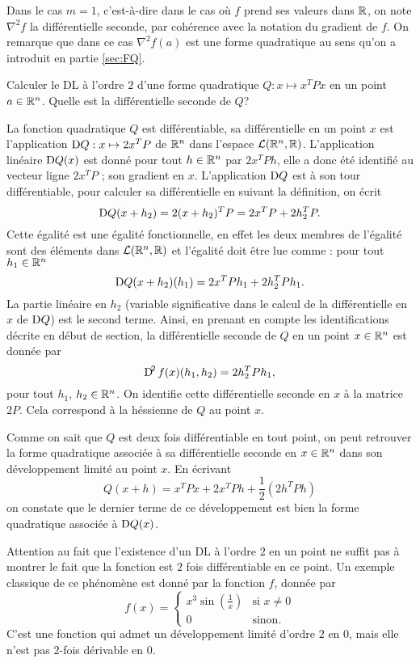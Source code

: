 \documentclass[11pt, a4paper]{article}
\begin{document}
Dans le cas $m = 1$, c'est-à-dire dans le cas où $f$ prend ses valeurs
dans $\mathbb{R}$, on note $\nabla^2f$ la différentielle seconde, par cohérence
avec la notation du gradient de $f$. On remarque que dans ce cas
$\nabla^2f(a)$ est une forme quadratique au sens qu'on a introduit en
partie \ref{sec:FQ}. 
\begin{question}
  Calculer le DL à l'ordre $2$ d'une forme quadratique
  $Q : x \mapsto x^TPx$ en un point $a \in \mathbb{R}^n$. Quelle est la
  différentielle seconde de $Q$?
\end{question}
\begin{solution}
  La fonction quadratique $Q$ est différentiable, sa différentielle en
  un point $x$ est l'application $\operatorname{D\!}{Q} : x \mapsto 2x^TP$ de $\mathbb{R}^n$
  dans l'espace $\mathcal{L}(\mathbb{R}^n, \mathbb{R})$. L'application linéaire $\operatorname{D\!}{Q}(x)$
  est donné pour tout $h \in \mathbb{R}^n$ par $2x^TPh$, elle a donc été
  identifié au vecteur ligne $2x^TP$ ; son gradient en
  $x$. L'application $\operatorname{D\!}{Q}$ est à son tour différentiable, pour
  calculer sa différentielle en suivant la définition, on écrit
  \[
    \operatorname{D\!}{Q}(x + h_2) = 2(x+h_2)^TP = 2x^TP + 2h_2^TP. 
  \]
  Cette égalité est une égalité fonctionnelle, en effet les deux
  membres de l'égalité sont des éléments dans $\mathcal{L}(\mathbb{R}^n, \mathbb{R})$ et
  l'égalité doit être lue comme : pour tout $h_1 \in \mathbb{R}^n$
  \[
    \operatorname{D\!}{Q}(x + h_2)(h_1) = 2x^TPh_1 + 2h_2^TPh_1.
  \]
  La partie linéaire en $h_2$ (variable significative dans le calcul
  de la différentielle en $x$ de $\operatorname{D\!}{Q}$) est le second terme. Ainsi,
  en prenant en compte les identifications décrite en début de
  section, la différentielle seconde de $Q$ en un point $x\in \mathbb{R}^n$ est donnée
  par
  \[
    \operatorname{D\!}^2{f}(x)(h_1, h_2) = 2h_2^TPh_1,
  \]
  pour tout $h_1$, $h_2 \in \mathbb{R}^n$. On identifie cette différentielle
  seconde en $x$ à la matrice $2P$. Cela correspond à la héssienne de
  $Q$ au point $x$.

  Comme on sait que $Q$ est deux fois différentiable en tout point, on
  peut retrouver la forme quadratique associée à sa différentielle
  seconde en $x \in \mathbb{R}^n$ dans son développement limité au point
  $x$. En écrivant
  \[
    Q(x+h) = x^TPx  + 2x^TPh + \frac{1}{2}(2h^TPh)
  \]
  on constate que le dernier terme de ce développement est bien la
  forme quadratique associée à $\operatorname{D\!}{Q}(x)$.

  Attention au fait que l'existence d'un DL à l'ordre $2$ en un point
  ne suffit pas à montrer le fait que la fonction est $2$ fois
  différentiable en ce point. Un exemple classique de ce phénomène est
  donné par la fonction $f$, donnée par
  \[
  f(x) = \left\{ \begin{array}{cl}
    x^3\sin\left(\frac{1}{x}\right) & \textrm{si $x \neq 0$} \\
    0 & \textrm{sinon.}
  \end{array}\right.
  \]
  C'est une fonction qui admet un développement limité d'ordre $2$ en
  $0$, mais elle n'est pas $2$-fois dérivable en $0$.
\end{solution}
\end{document}
